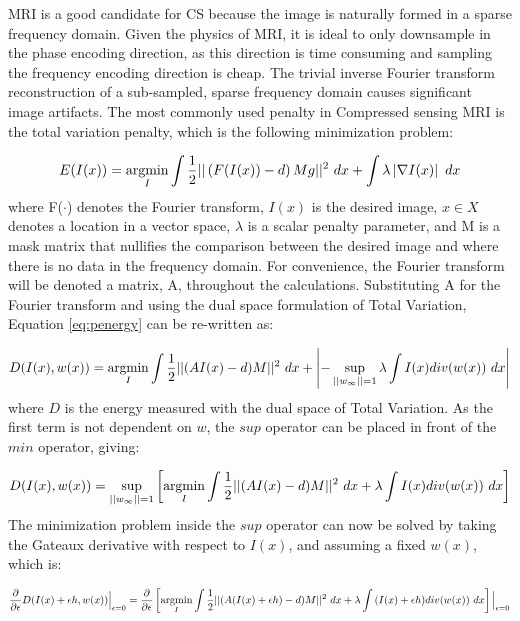 MRI is a good candidate for CS because the image is naturally formed in a sparse frequency domain. Given the physics of MRI, it is ideal to only downsample in the phase encoding direction, as this direction is time consuming and sampling the frequency encoding direction is cheap.  The trivial inverse Fourier transform reconstruction of a sub-sampled, sparse frequency domain causes significant image artifacts. The most commonly used penalty in Compressed sensing MRI is the total variation penalty, which is the following minimization problem:

\begin{equation}
E(I(x)) = \operatorname*{argmin}_I \int{}\frac{1}{2}||\left(F(I(x)) - d\right)Mg||^{2} \ dx + \int{}\lambda{}\left|\nabla{}I(x)\right| \ dx 
\end{equation}
where F($\cdot{}$) denotes the Fourier transform, $I(x)$ is the desired image, $x\in{}X$ denotes a location in a vector space, $\lambda{}$ is a scalar penalty parameter, and M is a mask matrix that nullifies the comparison between the desired image and where there is no data in the frequency domain. For convenience, the Fourier transform will be denoted a matrix, A, throughout the calculations. Substituting A for the Fourier transform and using the dual space formulation of Total Variation, Equation \ref{eq:penergy} can be re-written as:


\begin{equation}
D(I(x),w(x)) = \argmin_I  \int{}\frac{1}{2}||(AI(x) - d)M||^{2} \ dx + \left|-\sup_{||{w}_{\infty}||=1}\lambda{}\int{}I(x)div(w(x)) \ dx\right|
\end{equation}
where $D$ is the energy measured with the dual space of Total Variation. As the first term is not dependent on $w$, the $sup$ operator can be placed in front of the $min$ operator, giving: 

\begin{equation}
D(I(x),w(x)) = \sup_{||{w}_{\infty}||=1}\left[\argmin_I  \int{}\frac{1}{2}||(AI(x) - d)M||^{2} \ dx + \lambda{}\int{}I(x)div(w(x)) \ dx\right]\label{eq:duale}
\end{equation}
The minimization problem inside the $sup$ operator can now be solved by taking the Gateaux derivative with respect to $I(x)$, and assuming a fixed $w(x)$, which is:

\begin{equation}
\frac{\partial{}}{\partial{}\epsilon{}}D(I(x)+\epsilon{}h,w(x))\Big|_{\epsilon=0} = \frac{\partial{}}{\partial{}\epsilon{}}\left[\argmin_I  \int{}\frac{1}{2}||(A(I(x)+\epsilon{}h) - d)M||^{2} \ dx + \lambda{}\int{}(I(x)+\epsilon{}h)div(w(x)) \ dx\right]\Big|_{\epsilon=0}
\end{equation}

